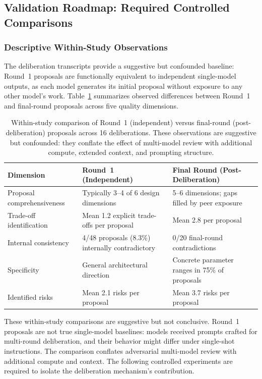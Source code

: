 \documentclass[11pt,a4paper]{article}
\begin{document}
\subsection{Validation Roadmap: Required Controlled Comparisons}
\label{sec:validation_roadmap}

\subsubsection{Descriptive Within-Study Observations}

The deliberation transcripts provide a suggestive but confounded baseline: Round~1 proposals are functionally equivalent to independent single-model outputs, as each model generates its initial proposal without exposure to any other model's work. Table~\ref{tab:baseline_comparison} summarizes observed differences between Round~1 and final-round proposals across five quality dimensions.

\begin{table}[ht]
\centering
\caption{Within-study comparison of Round~1 (independent) versus final-round (post-deliberation) proposals across 16 deliberations. These observations are suggestive but confounded: they conflate the effect of multi-model review with additional compute, extended context, and prompting structure.}
\label{tab:baseline_comparison}
\begin{tabular}{@{}p{3.2cm}p{4.5cm}p{4.5cm}@{}}
\toprule
\textbf{Dimension} & \textbf{Round~1 (Independent)} & \textbf{Final Round (Post-Deliberation)} \\
\midrule
Proposal comprehensiveness & Typically 3--4 of 6 design dimensions & 5--6 dimensions; gaps filled by peer exposure \\
Trade-off identification & Mean 1.2 explicit trade-offs per proposal & Mean 2.8 per proposal \\
Internal consistency & 4/48 proposals (8.3\%) internally contradictory & 0/20 final-round contradictions \\
Specificity & General architectural direction & Concrete parameter ranges in 75\% of proposals \\
Identified risks & Mean 2.1 risks per proposal & Mean 3.7 risks per proposal \\
\bottomrule
\end{tabular}
\end{table}

These within-study comparisons are suggestive but not conclusive. Round~1 proposals are not true single-model baselines: models received prompts crafted for multi-round deliberation, and their behavior might differ under single-shot instructions. The comparison conflates adversarial multi-model review with additional compute and context. The following controlled experiments are required to isolate the deliberation mechanism's contribution.
\end{document}
